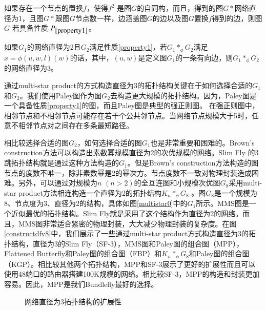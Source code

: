   \begin{prop}
\label{property1}
如果存在一个节点的置换$f$，使得$f^{2}$ 是图$G$的自同构，而且，得到的图$G*$网络直径为1，且图$G*$跟图$G$节点数一样，边涵盖图$G$的边以及图$G$置换$f$得到的边，则图$G$ 若具备性质 $P_{\ref{property1}}$。
\end{prop}

\begin{theo}
\label{diameter3}
如果$G_{1}$的网络直径为2且$G_{2}$满足性质\ref{property1}，若$G_{1}*_{\phi} G_{2}$满足$x=\phi(u,w,l)(w)$的话，其中，$(u,w)$是定义图$G_{1}$的一条有向边，则$G_{1}*_{\phi} G_{2}$ 的网络直径为3。
\end{theo}

通过multi-star product的方式构造直径为3的拓扑结构关键在于如何选择合适的$G_{1}$和$G_{2}$。我们使用Paley图作为图$G_{2}$去构造更大规模的拓扑结构。因为，Paley图是一个具备性质\ref{property1}的图，而且Paley图是典型的强正则图。
在强正则图中，相邻节点和不相邻节点可能存在若干个公共邻节点。当网络节点规模大于5时，任意不相邻节点对之间存在多条最短路径。

相比较选择合适的图$G_{2}$，如何选择合适的图$G_{1}$也是非常重要和困难的。Brown's construction方法可以构造出素数幂规模直径为2的次优规模的网络。Slim Fly 的3跳拓扑结构就是通过这种方法构造的$G_{1}$。但是Brown's construction方法构造的图节点的度数不唯一，除非素数幂是2的幂次方。节点度数不一致对物理封装造成困难。另外，可以通过对规模为$n$ $(n>2)$的全互连图和小规模次优图$G_{8}$采用multi-star product方法相连构造一个直径为2的拓扑结构$K_{n}*_{\phi}G_{8}$ 。图$G_{8}$是一个规模为8、节点度为3、直径为2的结构，具体如图\ref{multistar0}中的$G_{1}$所示。MMS图是一个近似最优的拓扑结构。Slim Fly就是采用了这个结构作为直径为2的网络。而且，MMS图非常适合紧密的物理封装，大大减少物理封装的复杂度。在图\ref{constructdfv8}中，我们展示了一些通过multi-star product方式构造直径为3的拓扑结构，直径为3的Slim Fly（SF-3），MMS图和Paley图的组合图（MPP），Flattened Butterfly和Paley图的组合图（FBP）和$K_{n}*_{\phi}G_{8}$和Paley图的组合图（KGP）。相比较其他两个拓扑结构，MPP和SF-3展示了更好的扩展性而且可以使用48端口的路由器搭建100K规模的网络。相比较SF-3，MPP的构造和封装更加容易。因此，MPP是我们Bundlefly最好的选择。

\begin{figure}[t]
\setlength{\belowcaptionskip}{-.3cm}%
  \centering
   \begin{minipage}[t]{\textwidth}
   \centering
  \vspace{-.3cm}
  \caption{网络直径为3拓扑结构的扩展性}
  \label{constructdfv89}
  \end{minipage}
\end{figure}


